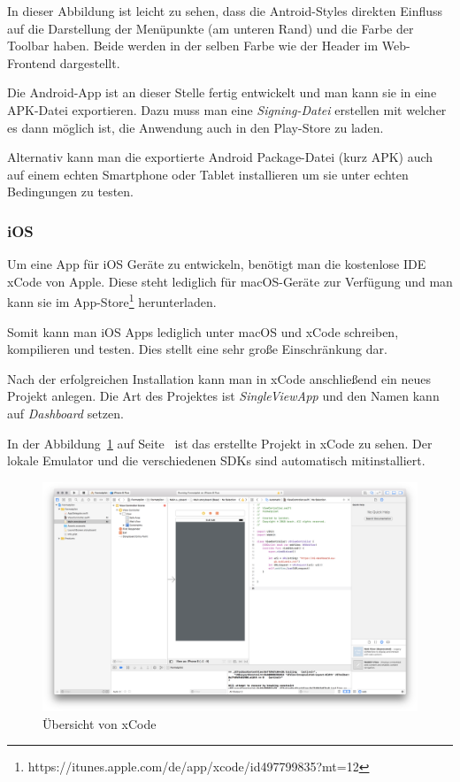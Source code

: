 In dieser Abbildung ist leicht zu sehen, dass die Antroid-Styles direkten Einfluss auf die Darstellung der Menüpunkte
(am unteren Rand) und die Farbe der Toolbar haben. Beide werden in der selben Farbe wie der Header im Web-Frontend
dargestellt.

Die Android-App ist an dieser Stelle fertig entwickelt und man kann sie in eine APK-Datei exportieren. Dazu muss man
eine \textit{Signing-Datei} erstellen mit welcher es dann möglich ist, die Anwendung auch in den Play-Store zu laden.

Alternativ kann man die exportierte Android Package-Datei (kurz APK) auch auf einem echten Smartphone oder Tablet
installieren um sie unter echten Bedingungen zu testen.

\subsubsection{iOS}
Um eine App für iOS Geräte zu entwickeln, benötigt man die kostenlose IDE xCode von Apple. Diese steht lediglich für
macOS-Geräte zur Verfügung und man kann sie im App-Store\footnote{https://itunes.apple.com/de/app/xcode/id497799835?mt=12}
herunterladen.

Somit kann man iOS Apps lediglich unter macOS und xCode schreiben, kompilieren und testen. Dies stellt eine sehr große
Einschränkung dar.

Nach der erfolgreichen Installation kann man in xCode anschließend ein neues Projekt anlegen. Die Art des Projektes ist
\textit{SingleViewApp} und den Namen kann auf \textit{Dashboard} setzen.

In der Abbildung~\ref{fig:umsetzung_ios_ide} auf Seite~\pageref{fig:umsetzung_ios_ide} ist das erstellte Projekt in
xCode zu sehen. Der lokale Emulator und die verschiedenen SDKs sind automatisch mitinstalliert.

\begin{figure}[h]
    \centering
    \includegraphics[width=\textwidth]{images/kapitel_4/ios_ide.png}
    \caption{Übersicht von xCode}
    \label{fig:umsetzung_ios_ide}
\end{figure}

